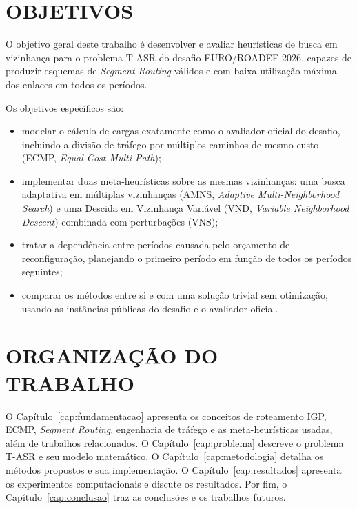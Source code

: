 \section{\uppercase{Objetivos}}

O objetivo geral deste trabalho é desenvolver e avaliar heurísticas de busca em vizinhança para o problema T-ASR do desafio EURO/ROADEF 2026, capazes de produzir esquemas de \textit{Segment Routing} válidos e com baixa utilização máxima dos enlaces em todos os períodos.

Os objetivos específicos são:
\begin{itemize}
    \item modelar o cálculo de cargas exatamente como o avaliador oficial do desafio, incluindo a divisão de tráfego por múltiplos caminhos de mesmo custo (ECMP, \textit{Equal-Cost Multi-Path});
    \item implementar duas meta-heurísticas sobre as mesmas vizinhanças: uma busca adaptativa em múltiplas vizinhanças (AMNS, \textit{Adaptive Multi-Neighborhood Search}) e uma Descida em Vizinhança Variável (VND, \textit{Variable Neighborhood Descent}) combinada com perturbações (VNS);
    \item tratar a dependência entre períodos causada pelo orçamento de reconfiguração, planejando o primeiro período em função de todos os períodos seguintes;
    \item comparar os métodos entre si e com uma solução trivial sem otimização, usando as instâncias públicas do desafio e o avaliador oficial.
\end{itemize}

\section{\uppercase{Organização do Trabalho}}

O Capítulo~\ref{cap:fundamentacao} apresenta os conceitos de roteamento IGP, ECMP, \textit{Segment Routing}, engenharia de tráfego e as meta-heurísticas usadas, além de trabalhos relacionados. O Capítulo~\ref{cap:problema} descreve o problema T-ASR e seu modelo matemático. O Capítulo~\ref{cap:metodologia} detalha os métodos propostos e sua implementação. O Capítulo~\ref{cap:resultados} apresenta os experimentos computacionais e discute os resultados. Por fim, o Capítulo~\ref{cap:conclusao} traz as conclusões e os trabalhos futuros.
